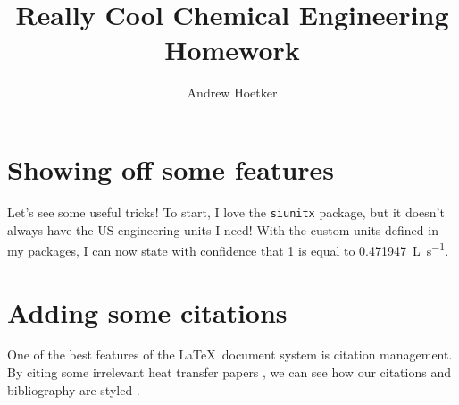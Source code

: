 \documentclass[12pt,letterpaper]{apa6}
\title{Really Cool Chemical Engineering Homework}
\author{Andrew Hoetker}
\begin{document}
    \maketitle

    \section{Showing off some features}

    Let's see some useful tricks! To start, I love the \texttt{siunitx} package, but it doesn't always have the US engineering units I need! With the custom units defined in my packages, I can now state with confidence that \SI{1}{\cfm} is equal to \SI{0.471947}{\liter\per\second}.

    \section{Adding some citations}

    One of the best features of the \LaTeX\ document system is citation management. By citing some irrelevant heat transfer papers \autocite{bohnetFoulingHeatTransfer1987,prabhanjanComparisonHeatTransfer2002}, we can see how our citations and bibliography are styled \autocite{wongLogMeanHeat2009}.

    \printbibliography
\end{document}
